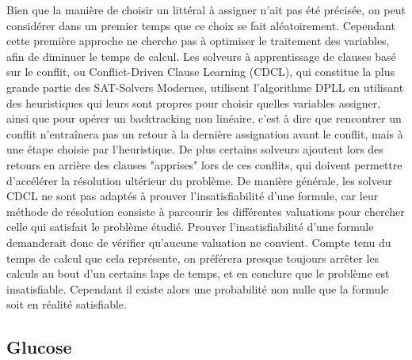 \documentclass[a4paper,11pt]{article}
\begin{document}
Bien que la manière de choisir un littéral à assigner n'ait pas été précisée, on peut considérer dans un premier temps que ce choix se fait aléatoirement. Cependant cette première approche ne cherche pas à 
optimiser le traitement des variables, afin de diminuer le temps de calcul. Les solveurs à apprentissage de clauses basé sur le conflit, ou Conflict-Driven Clause Learning (CDCL), qui constitue la plus grande 
partie des SAT-Solvers Modernes, utilisent l'algorithme DPLL en utilisant des heuristiques qui leurs sont propres pour choisir quelles variables assigner, ainsi que pour opérer un backtracking non linéaire, c'est 
à dire que rencontrer un conflit n’entraînera pas un retour à la dernière assignation avant le conflit, mais à une étape choisie par l'heuristique. De plus certains solveurs ajoutent lors des retours en arrière 
des clauses "apprises" lors de ces conflits, qui doivent permettre d’accélérer la résolution ultérieur du problème. De manière générale, les solveur CDCL ne sont pas adaptés à prouver l'insatisfiabilité d'une 
formule, car leur méthode de résolution consiste à parcourir les différentes valuations pour chercher celle qui satisfait le problème étudié. Prouver l'insatisfiabilité d'une formule demanderait donc de vérifier 
qu'aucune valuation ne convient. Compte tenu du temps de calcul que cela représente, on préférera presque toujours arrêter les calculs au bout d'un certains laps de temps, et en conclure que le problème est insatisfiable. 
Cependant il existe alors une probabilité non nulle que la formule soit en réalité satisfiable.


\subsection{Glucose}
\end{document}
